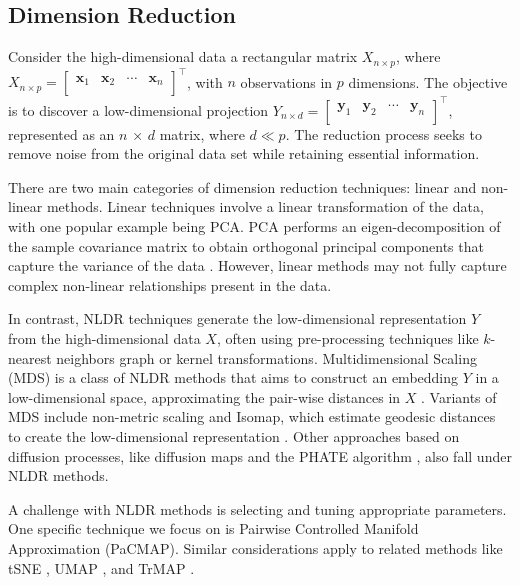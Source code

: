 \documentclass[
  12pt]{article}
\begin{document}
\hypertarget{dimension-reduction}{%
\subsection{Dimension Reduction}\label{dimension-reduction}}

Consider the high-dimensional data a rectangular matrix
\(X_{n \times p}\), where
\(X_{n \times p} = \begin{bmatrix} \textbf{x}_{1} & \textbf{x}_{2} & \cdots & \textbf{x}_{n}\\ \end{bmatrix}^\top\),
with \(n\) observations in \(p\) dimensions. The objective is to
discover a low-dimensional projection
\(Y_{n \times d} = \begin{bmatrix} \textbf{y}_{1} & \textbf{y}_{2} & \cdots & \textbf{y}_{n}\\ \end{bmatrix}^\top\),
represented as an \(n\) × \(d\) matrix, where \(d \ll p\). The reduction
process seeks to remove noise from the original data set while retaining
essential information.

There are two main categories of dimension reduction techniques: linear
and non-linear methods. Linear techniques involve a linear
transformation of the data, with one popular example being PCA. PCA
performs an eigen-decomposition of the sample covariance matrix to
obtain orthogonal principal components that capture the variance of the
data \citep{Karl1901}. However, linear methods may not fully capture
complex non-linear relationships present in the data.

In contrast, NLDR techniques generate the low-dimensional representation
\(Y\) from the high-dimensional data \(X\), often using pre-processing
techniques like \(k\)-nearest neighbors graph or kernel transformations.
Multidimensional Scaling (MDS) is a class of NLDR methods that aims to
construct an embedding \(Y\) in a low-dimensional space, approximating
the pair-wise distances in \(X\) \citep{Torgerson1967}. Variants of MDS
include non-metric scaling \citep{article62} and Isomap, which estimate
geodesic distances to create the low-dimensional representation
\citep{article63}. Other approaches based on diffusion processes, like
diffusion maps \citep{article64} and the PHATE algorithm
\citep{article03}, also fall under NLDR methods.

A challenge with NLDR methods is selecting and tuning appropriate
parameters. One specific technique we focus on is Pairwise Controlled
Manifold Approximation (PaCMAP). Similar considerations apply to related
methods like tSNE \citep{Laurens2008}, UMAP \citep{Leland2018}, and
TrMAP \citep{article02}.
\end{document}
